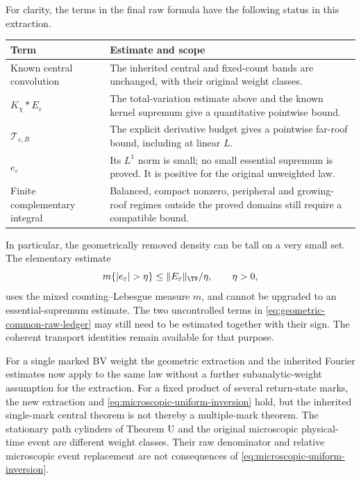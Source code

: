 For clarity, the terms in the final raw formula have the following
status in this extraction.
\begin{center}
\begin{tabular}{p{}p{}}
\hline
Term & Estimate and scope\\
\hline
Known central convolution & The inherited central and fixed-count bands
are unchanged, with their original weight classes.\\
$K_\chi*E_\varepsilon$ & The total-variation estimate above and the known
kernel supremum give a quantitative pointwise bound.\\
$\mathcal T_{\varepsilon,B}$ & The explicit derivative budget gives a
pointwise far-roof bound, including at linear $L$.\\
$e_\varepsilon$ & Its $L^1$ norm is small; no small essential supremum
is proved. It is positive for the original unweighted law.\\
Finite complementary integral & Balanced, compact nonzero, peripheral
and growing-roof regimes outside the proved domains still require a
compatible bound.\\
\hline
\end{tabular}
\end{center}

In particular, the geometrically removed density can be tall on a very
small set. The elementary estimate
\[
 m\{|e_\varepsilon|>\eta\}
        \le \|E_\varepsilon\|_{\TV}/\eta,\qquad \eta>0,
\]
uses the mixed counting--Lebesgue measure $m$, and cannot be upgraded to
an essential-supremum estimate. The two uncontrolled terms in
\eqref{eq:geometric-common-raw-ledger} may still need to be estimated
together with their sign. The coherent transport identities remain
available for that purpose.

For a single marked BV weight the geometric extraction and the inherited
Fourier estimates now apply to the same law without a further
subanalytic-weight assumption for the extraction. For a fixed product
of several return-state marks, the new extraction and
\eqref{eq:microscopic-uniform-inversion} hold, but the inherited
single-mark central theorem is not thereby a multiple-mark theorem.
The stationary path cylinders of Theorem U and the original microscopic
physical-time event are different weight classes. Their raw denominator
and relative microscopic event replacement are not consequences of
\eqref{eq:microscopic-uniform-inversion}.
